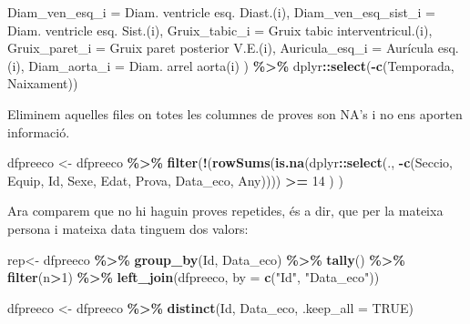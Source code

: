 \documentclass[
]{book}
\newenvironment{Shaded}{\begin{snugshade}}{\end{snugshade}}
\newcommand{\AttributeTok}[1]{\textcolor[rgb]{0.13,0.29,0.53}{#1}}
\newcommand{\ConstantTok}[1]{\textcolor[rgb]{0.56,0.35,0.01}{#1}}
\newcommand{\DecValTok}[1]{\textcolor[rgb]{0.00,0.00,0.81}{#1}}
\newcommand{\FunctionTok}[1]{\textcolor[rgb]{0.13,0.29,0.53}{\textbf{#1}}}
\newcommand{\NormalTok}[1]{#1}
\newcommand{\OtherTok}[1]{\textcolor[rgb]{0.56,0.35,0.01}{#1}}
\newcommand{\SpecialCharTok}[1]{\textcolor[rgb]{0.81,0.36,0.00}{\textbf{#1}}}
\newcommand{\StringTok}[1]{\textcolor[rgb]{0.31,0.60,0.02}{#1}}
\theoremstyle{definition}
\theoremstyle{definition}
\theoremstyle{definition}
\theoremstyle{definition}
\theoremstyle{remark}
\begin{document}
\begin{Shaded}
\begin{Highlighting}[]
    \AttributeTok{Diam\_ven\_esq\_i =} \StringTok{\textasciigrave{}}\AttributeTok{Diam. ventricle esq. Diast.(i)}\StringTok{\textasciigrave{}}\NormalTok{,}
    \AttributeTok{Diam\_ven\_esq\_sist\_i =} \StringTok{\textasciigrave{}}\AttributeTok{Diam. ventricle esq. Sist.(i)}\StringTok{\textasciigrave{}}\NormalTok{,}
    \AttributeTok{Gruix\_tabic\_i =} \StringTok{\textasciigrave{}}\AttributeTok{Gruix tabic interventricul.(i)}\StringTok{\textasciigrave{}}\NormalTok{,}
    \AttributeTok{Gruix\_paret\_i =} \StringTok{\textasciigrave{}}\AttributeTok{Gruix paret posterior V.E.(i)}\StringTok{\textasciigrave{}}\NormalTok{,}
    \AttributeTok{Auricula\_esq\_i =} \StringTok{\textasciigrave{}}\AttributeTok{Aurícula esq.(i)}\StringTok{\textasciigrave{}}\NormalTok{,}
    \AttributeTok{Diam\_aorta\_i =} \StringTok{\textasciigrave{}}\AttributeTok{Diam. arrel aorta(i)}\StringTok{\textasciigrave{}}
\NormalTok{  ) }\SpecialCharTok{\%\textgreater{}\%}\NormalTok{ dplyr}\SpecialCharTok{::}\FunctionTok{select}\NormalTok{(}\SpecialCharTok{{-}}\FunctionTok{c}\NormalTok{(Temporada, Naixament)) }
\end{Highlighting}
\end{Shaded}

Eliminem aquelles files on totes les columnes de proves son NA's i no ens aporten informació.

\begin{Shaded}
\begin{Highlighting}[]
\NormalTok{dfpreeco }\OtherTok{\textless{}{-}}\NormalTok{ dfpreeco }\SpecialCharTok{\%\textgreater{}\%}
  \FunctionTok{filter}\NormalTok{(}\SpecialCharTok{!}\NormalTok{(}\FunctionTok{rowSums}\NormalTok{(}\FunctionTok{is.na}\NormalTok{(dplyr}\SpecialCharTok{::}\FunctionTok{select}\NormalTok{(., }\SpecialCharTok{{-}}\FunctionTok{c}\NormalTok{(Seccio, Equip, Id, Sexe, Edat, Prova, Data\_eco, Any)))) }\SpecialCharTok{\textgreater{}=} \DecValTok{14}\NormalTok{ ) ) }
\end{Highlighting}
\end{Shaded}

Ara comparem que no hi haguin proves repetides, és a dir, que per la mateixa persona i mateixa data tinguem dos valors:

\begin{Shaded}
\begin{Highlighting}[]
\NormalTok{rep}\OtherTok{\textless{}{-}}\NormalTok{ dfpreeco }\SpecialCharTok{\%\textgreater{}\%}
  \FunctionTok{group\_by}\NormalTok{(Id, Data\_eco) }\SpecialCharTok{\%\textgreater{}\%}  
  \FunctionTok{tally}\NormalTok{() }\SpecialCharTok{\%\textgreater{}\%} 
  \FunctionTok{filter}\NormalTok{(n}\SpecialCharTok{\textgreater{}}\DecValTok{1}\NormalTok{) }\SpecialCharTok{\%\textgreater{}\%} 
  \FunctionTok{left\_join}\NormalTok{(dfpreeco, }\AttributeTok{by =} \FunctionTok{c}\NormalTok{(}\StringTok{"Id"}\NormalTok{, }\StringTok{"Data\_eco"}\NormalTok{)) }

\NormalTok{dfpreeco }\OtherTok{\textless{}{-}}\NormalTok{ dfpreeco }\SpecialCharTok{\%\textgreater{}\%} \FunctionTok{distinct}\NormalTok{(Id, Data\_eco, }\AttributeTok{.keep\_all =} \ConstantTok{TRUE}\NormalTok{)}
\end{Highlighting}
\end{Shaded}
\end{document}
